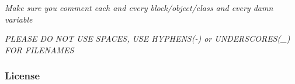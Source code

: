 \begin{DoxyItemize}
\item {\itshape Make sure you comment each and every block/object/class and every damn variable}
\item {\itshape P\+L\+E\+A\+SE DO N\+OT U\+SE S\+P\+A\+C\+ES, U\+SE H\+Y\+P\+H\+E\+NS(-\/) or U\+N\+D\+E\+R\+S\+C\+O\+R\+E\+S(\+\_\+) F\+OR F\+I\+L\+E\+N\+A\+M\+ES}
\end{DoxyItemize}

\subsubsection*{License}